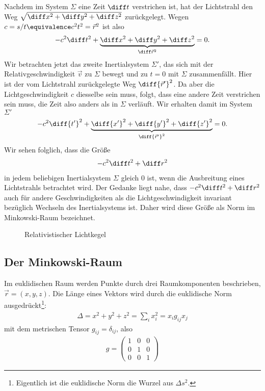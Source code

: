 Nachdem im System $\Sigma$ eine Zeit $\diff t$ verstrichen ist, hat der Lichtstrahl den Weg $\sqrt{\diff x^2+\diff y^2+\diff z^2}$ zurückgelegt.
Wegen $c=s/t\equivalence c^2 t^2 = \vec r^2$ ist also
\begin{align*}
    -c^2 \diff t^2+\underbrace{\diff x^2+\diff y^2+\diff z^2}_{\diff\vec r^2}=0.
\end{align*}
Wir betrachten jetzt das zweite Inertialsystem $\Sigma'$, das sich mit der Relativgeschwindigkeit $\vec v$ zu $\Sigma$ bewegt und zu $t=0$ mit $\Sigma$ zusammenfällt.
Hier ist der vom Lichtstrahl zurückgelegte Weg $\diff{\vec r'}^2$.
Da aber die Lichtgeschwindigkeit $c$ diesselbe sein muss, folgt, dass eine andere Zeit verstrichen sein muss, die Zeit also anders als in $\Sigma$ verläuft.
Wir erhalten damit im System $\Sigma'$
\begin{align*}
    -c^2 \diff{t'}^2+\underbrace{\diff{x'}^2+\diff{y'}^2+\diff{z'}^2}_{\diff{\vec r'}^2}=0.
\end{align*}
Wir sehen folglich, dass die Größe
\begin{align*}
    -c^2\diff t^2+\diff r^2
\end{align*}
in jedem beliebigen Inertialsystem $\Sigma$ gleich $0$ ist, wenn die Ausbreitung eines Lichtstrahls betrachtet wird.
Der Gedanke liegt nahe, dass $-c^2\diff t^2+\diff r^2$ auch für andere Geschwindigkeiten als die Lichtgeschwindigkeit invariant bezüglich Wechseln des Inertialsystems ist.
Daher wird diese Größe als Norm im Minkowski-Raum bezeichnet.


\begin{figure}[htb]
    \centering
    \tfigSRTLichtkegel
    \caption{Relativistischer Lichtkegel}
    \label{fig:srt_lichtkegel}
\end{figure}


\subsection{Der Minkowski-Raum}

Im euklidischen Raum werden Punkte durch drei Raumkomponenten beschrieben, $\vec r=(x,y,z)$.
Die Länge eines Vektors wird durch die euklidische Norm ausgedrückt\footnote{Eigentlich ist die euklidische Norm die Wurzel aus $\Delta s^2$.}:
\begin{align}
    \label{eq:euklidische_norm}
    \Delta=x^2+y^2+z^2=\sum_i x_i^2=x_ig_{ij}x_j
\end{align}
mit dem metrischen Tensor $g_{ij}=\delta_{ij}$, also
\begin{align*}
    g = \begin{pmatrix}
            1 & 0 & 0 \\
            0 & 1 & 0 \\
            0 & 0 & 1
        \end{pmatrix}
\end{align*}

